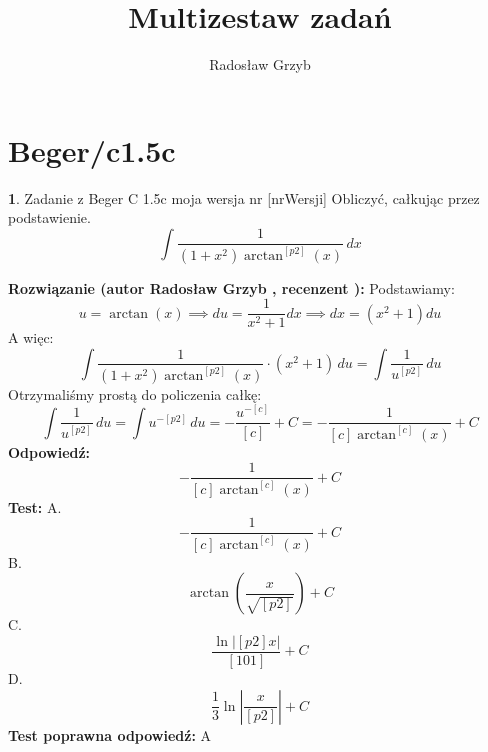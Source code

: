 \documentclass[12pt, a4paper]{article}
\title{Multizestaw zadań}
\author{Radosław Grzyb}
\date{}
\theoremstyle{definition} %
\newtheorem{zad}{}
\newcommand{\kategoria}[1]{\section{#1}} %
\newcommand{\zadStart}[1]{\begin{zad}#1\newline} %
\newcommand{\zadStop}{\end{zad}}   %
\newcommand{\rozwStart}[2]{\noindent \textbf{Rozwiązanie (autor #1 , recenzent #2): }\newline} %
\newcommand{\rozwStop}{\newline}                                            %
\newcommand{\odpStart}{\noindent \textbf{Odpowiedź:}\newline}    %
\newcommand{\odpStop}{\newline}                                             %
\newcommand{\testStart}{\noindent \textbf{Test:}\newline} %
\newcommand{\testStop}{\newline} %
\newcommand{\kluczStart}{\noindent \textbf{Test poprawna odpowiedź:}\newline} %
\newcommand{\kluczStop}{\newline} %
\begin{document}
\maketitle
\kategoria{Beger/c1.5c}
\zadStart{Zadanie z Beger C 1.5c moja wersja nr [nrWersji]}
Obliczyć, całkując przez podstawienie.
$$\int \frac{1}{(1+x^2)\arctan^{[p2]}(x)} \,dx$$
\zadStop
\rozwStart{Radosław Grzyb}{}
Podstawiamy:
$$u=\arctan(x) \implies du=\frac{1}{x^2+1}dx \implies dx=(x^2+1)du$$
A więc:
$$\int \frac{1}{(1+x^2)\arctan^{[p2]}(x)}\cdot(x^2+1) \,du=\int \frac{1}{u^{[p2]}}\,du$$
Otrzymaliśmy prostą do policzenia całkę:
$$\int\frac{1}{u^{[p2]}}\,du=\int u^{-[p2]}\,du=-\frac{u^{-[c]}}{[c]}+C=-\frac{1}{[c]\arctan^{[c]}(x)}+C$$
\rozwStop
\odpStart
$$-\frac{1}{[c]\arctan^{[c]}(x)}+C$$
\odpStop
\testStart
A.$$-\frac{1}{[c]\arctan^{[c]}(x)}+C$$
B.$$\arctan(\frac{x}{\sqrt{[p2]}})+C$$
C.$$\frac{\ln|[p2]x|}{[101]}+C$$
D.$$\frac{1}{3}\ln|\frac{x}{[p2]}|+C$$
\testStop
\kluczStart
A
\kluczStop
\end{document}

